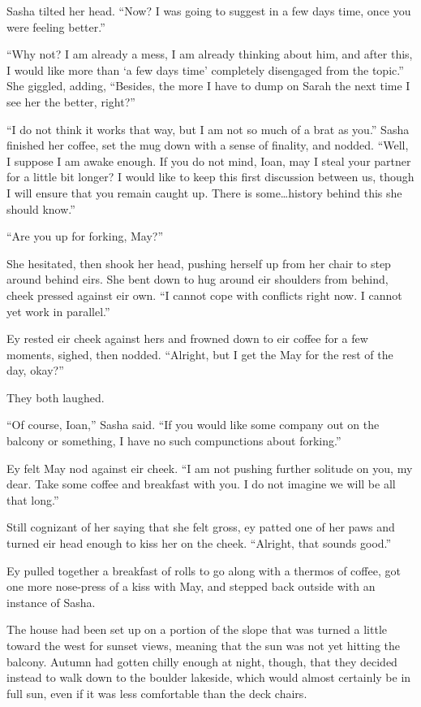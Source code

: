 Sasha tilted her head. ``Now? I was going to suggest in a few days time, once you were feeling better.''

``Why not? I am already a mess, I am already thinking about him, and after this, I would like more than `a few days time' completely disengaged from the topic.'' She giggled, adding, ``Besides, the more I have to dump on Sarah the next time I see her the better, right?''

``I do not think it works that way, but I am not so much of a brat as you.'' Sasha finished her coffee, set the mug down with a sense of finality, and nodded. ``Well, I suppose I am awake enough. If you do not mind, Ioan, may I steal your partner for a little bit longer? I would like to keep this first discussion between us, though I will ensure that you remain caught up. There is some\ldots history behind this she should know.''

``Are you up for forking, May?''

She hesitated, then shook her head, pushing herself up from her chair to step around behind eirs. She bent down to hug around eir shoulders from behind, cheek pressed against eir own. ``I cannot cope with conflicts right now. I cannot yet work in parallel.''

Ey rested eir cheek against hers and frowned down to eir coffee for a few moments, sighed, then nodded. ``Alright, but I get the May for the rest of the day, okay?''

They both laughed.

``Of course, Ioan,'' Sasha said. ``If you would like some company out on the balcony or something, I have no such compunctions about forking.''

Ey felt May nod against eir cheek. ``I am not pushing further solitude on you, my dear. Take some coffee and breakfast with you. I do not imagine we will be all that long.''

Still cognizant of her saying that she felt gross, ey patted one of her paws and turned eir head enough to kiss her on the cheek. ``Alright, that sounds good.''

Ey pulled together a breakfast of rolls to go along with a thermos of coffee, got one more nose-press of a kiss with May, and stepped back outside with an instance of Sasha.

The house had been set up on a portion of the slope that was turned a little toward the west for sunset views, meaning that the sun was not yet hitting the balcony. Autumn had gotten chilly enough at night, though, that they decided instead to walk down to the boulder lakeside, which would almost certainly be in full sun, even if it was less comfortable than the deck chairs.

